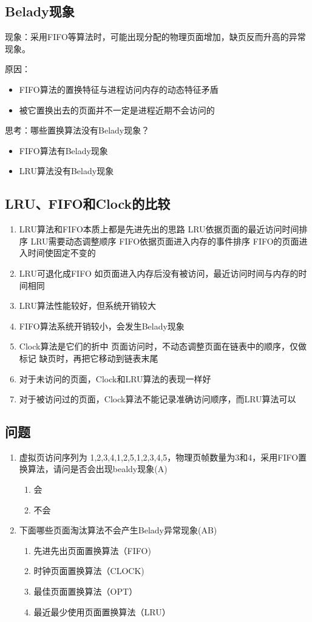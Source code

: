 \subsection{Belady现象}
现象：采用FIFO等算法时，可能出现分配的物理页面增加，缺页反而升高的异常现象。
\par 原因：
\begin{itemize}
	\item FIFO算法的置换特征与进程访问内存的动态特征矛盾
	\item 被它置换出去的页面并不一定是进程近期不会访问的
\end{itemize}
\par 思考：哪些置换算法没有Belady现象？
\begin{itemize}
	\item FIFO算法有Belady现象
	\item LRU算法没有Belady现象
\end{itemize}
\subsection{LRU、FIFO和Clock的比较}
\begin{enumerate}
	\item LRU算法和FIFO本质上都是先进先出的思路
	\subitem LRU依据页面的最近访问时间排序
	\subitem LRU需要动态调整顺序
	\subitem FIFO依据页面进入内存的事件排序
	\subitem FIFO的页面进入时间使固定不变的
	\item LRU可退化成FIFO
	\subitem 如页面进入内存后没有被访问，最近访问时间与内存的时间相同
	\item LRU算法性能较好，但系统开销较大
	\item FIFO算法系统开销较小，会发生Belady现象
	\item Clock算法是它们的折中
	\subitem 页面访问时，不动态调整页面在链表中的顺序，仅做标记
	\subitem 缺页时，再把它移动到链表末尾
	\item 对于未访问的页面，Clock和LRU算法的表现一样好
	\item 对于被访问过的页面，Clock算法不能记录准确访问顺序，而LRU算法可以
\end{enumerate}
\subsection{问题}
\begin{enumerate}
	\item 虚拟页访问序列为 1,2,3,4,1,2,5,1,2,3,4,5，物理页帧数量为3和4，采用FIFO置换算法，请问是否会出现bealdy现象(A)
	\begin{enumerate}[A]
		\item 会
		\item 不会
	\end{enumerate}
\item 下面哪些页面淘汰算法不会产生Belady异常现象(AB)
\begin{enumerate}[A]
	\item 先进先出页面置换算法（FIFO) 
	\item 时钟页面置换算法（CLOCK) 
	\item 最佳页面置换算法（OPT） 
	\item 最近最少使用页面置换算法（LRU）
\end{enumerate}
\end{enumerate}

